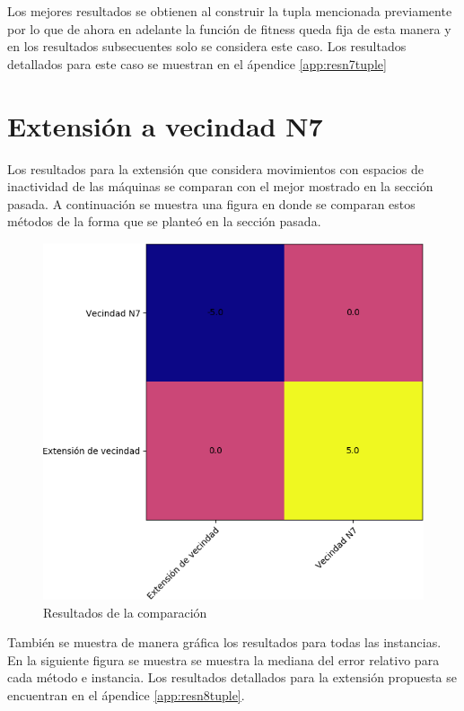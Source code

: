 Los mejores resultados se obtienen al construir la tupla mencionada previamente por lo que de ahora en adelante la función de fitness queda fija de esta manera y en los resultados subsecuentes solo se considera este caso. Los resultados detallados para este caso se muestran en el ápendice \ref{app:resn7tuple}

\section{Extensión a vecindad N7}
Los resultados para la extensión que considera movimientos con espacios de inactividad de las máquinas se comparan con el mejor mostrado en la sección pasada. A continuación se muestra una figura en donde se comparan estos métodos de la forma que se planteó en la sección pasada.

\begin{figure}[H]
    \centering
    \includegraphics[scale=.7]{Imagenes/n8vsn7.png}
    \caption{Resultados de la comparación}
\end{figure}

También se muestra de manera gráfica los resultados para todas las instancias. En la siguiente figura se muestra se muestra la mediana del error relativo para cada método e instancia.  Los resultados detallados para la extensión propuesta se encuentran en el ápendice \ref{app:resn8tuple}.


